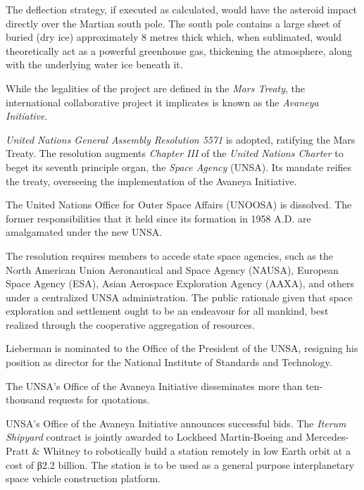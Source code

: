 The deflection strategy, if executed as calculated, would have the asteroid impact directly over the Martian south pole. The south pole contains a large sheet of buried  (dry ice) approximately 8 metres thick which, when sublimated, would theoretically act as a powerful greenhouse gas, thickening the atmosphere, along with the underlying water ice beneath it.

While the legalities of the project are defined in the {\it Mars Treaty}, the international collaborative project it implicates is known as the {\it Avaneya Initiative}.
\StopTimelineDate

{\it United Nations General Assembly Resolution 5571} is adopted, ratifying the Mars Treaty. The resolution augments {\it Chapter III} of the {\it United Nations Charter} to beget its seventh principle organ, the {\it Space Agency} (UNSA). Its mandate reifies the treaty, overseeing the implementation of the Avaneya Initiative.

The United Nations Office for Outer Space Affairs (UNOOSA) is dissolved. The former responsibilities that it held since its formation in 1958 A.D. are amalgamated under the new UNSA.

The resolution requires members to accede state space agencies, such as the North American Union Aeronautical and Space Agency (NAUSA), European Space Agency (ESA), Asian Aerospace Exploration Agency (AAXA), and others under a centralized UNSA administration. The public rationale given that space exploration and settlement ought to be an endeavour for all mankind, best realized through the cooperative aggregation of resources.

Lieberman is nominated to the Office of the President of the UNSA, resigning his position as director for the National Institute of Standards and Technology.
\StopTimelineDate

The UNSA's Office of the Avaneya Initiative disseminates more than ten-thousand requests for quotations.
\StopTimelineDate

UNSA's Office of the Avaneya Initiative announces successful bids. The {\it Iterum Shipyard} contract is jointly awarded to Lockheed Martin-Boeing and Mercedes-Pratt & Whitney to robotically build a station remotely in low Earth orbit at a cost of β2.2 billion. The station is to be used as a general purpose interplanetary space vehicle construction platform.

